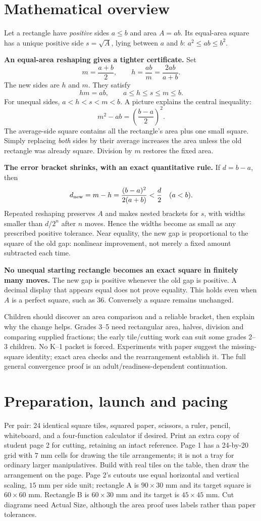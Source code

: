 \documentclass[11pt,letterpaper]{article}
\begin{document}
\section*{Mathematical overview}
Let a rectangle have \emph{positive} sides $a\le b$ and area $A=ab$. Its equal-area square has a unique positive side $s=\sqrt A$, lying between $a$ and $b$: $a^2\le ab\le b^2$.

\textbf{An equal-area reshaping gives a tighter certificate.} Set
\[m=\frac{a+b}{2},\qquad h=\frac{ab}{m}=\frac{2ab}{a+b}.\]
The new sides are $h$ and $m$. They satisfy
\[hm=ab,\qquad a\le h\le s\le m\le b.\]
For unequal sides, $a<h<s<m<b$. A picture explains the central inequality:
\[m^2-ab=\left(\frac{b-a}{2}\right)^2.\]
The average-side square contains all the rectangle's area plus one small square. Simply replacing \emph{both} sides by their average increases the area unless the old rectangle was already square. Division by $m$ restores the fixed area.

\textbf{The error bracket shrinks, with an exact quantitative rule.} If $d=b-a$, then
\[d_{\rm new}=m-h=\frac{(b-a)^2}{2(a+b)}<\frac d2\quad(a<b).\]
Repeated reshaping preserves $A$ and makes nested brackets for $s$, with widths smaller than $d/2^n$ after $n$ moves. Hence the widths become as small as any prescribed positive tolerance. Near equality, the new gap is proportional to the square of the old gap: nonlinear improvement, not merely a fixed amount subtracted each time.

\textbf{No unequal starting rectangle becomes an exact square in finitely many moves.} The new gap is positive whenever the old gap is positive. A decimal display that appears equal does not prove equality. This holds even when $A$ is a perfect square, such as $36$. Conversely a square remains unchanged.

Children should discover an area comparison and a reliable bracket, then explain why the change helps. Grades 3--5 need rectangular area, halves, division and comparing supplied fractions; the early tile/cutting work can suit some grades 2--3 children. No K--1 packet is forced. Experiments with paper suggest the missing-square identity; exact area checks and the rearrangement establish it. The full general convergence proof is an adult/readiness-dependent continuation.
\newpage
\section*{Preparation, launch and pacing}
Per pair: 24 identical square tiles, squared paper, scissors, a ruler, pencil, whiteboard, and a four-function calculator if desired. Print an extra copy of student page 2 for cutting, retaining an intact reference. Page 1 has a 24-by-20 grid with $7$ mm cells for drawing the tile arrangements; it is not a tray for ordinary larger manipulatives. Build with real tiles on the table, then draw the arrangement on the page. Page 2's cutouts use equal horizontal and vertical scaling, $15$ mm per side unit; rectangle A is $90\times30$ mm and its target square is $60\times60$ mm. Rectangle B is $60\times30$ mm and its target is $45\times45$ mm. Cut diagrams need Actual Size, although the area proof uses labels rather than paper tolerances.
\end{document}
